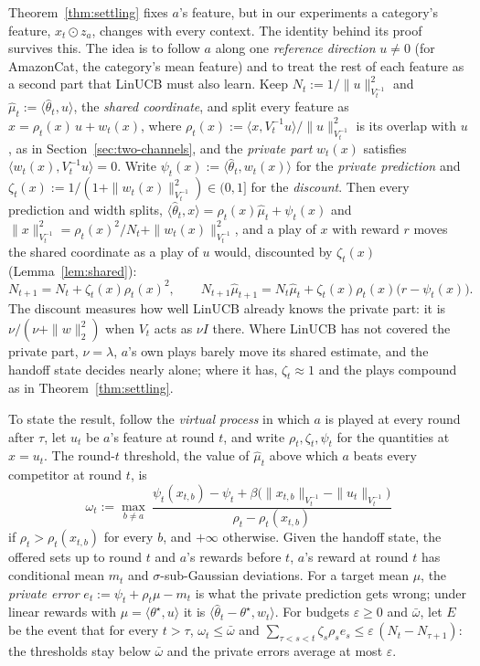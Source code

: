 \documentclass[anon]{alt2027} %
\newif\ifrevmarks\revmarkstrue
\newenvironment{revised}{\ifrevmarks\color{revcolor}\fi}{}
\begin{document}
\begin{revised}
Theorem~\ref{thm:settling} fixes $a$'s feature, but in our experiments a
category's feature, $x_t\odot z_a$, changes with every context. The identity
behind its proof survives this. The idea is to follow $a$ along one
\emph{reference direction} $u\ne0$ (for AmazonCat, the category's mean
feature) and to treat the rest of each feature as a second part that LinUCB
must also learn. Keep $N_t:=1/\|u\|^2_{V_t^{-1}}$ and
$\widehat\mu_t:=\langle\widehat\theta_t,u\rangle$, the \emph{shared
coordinate}, and split every feature as $x=\rho_t(x)\,u+w_t(x)$, where
$\rho_t(x):=\langle x,V_t^{-1}u\rangle/\|u\|^2_{V_t^{-1}}$ is its overlap
with $u$, as in Section~\ref{sec:two-channels}, and the \emph{private part} $w_t(x)$ satisfies
$\langle w_t(x),V_t^{-1}u\rangle=0$. Write
$\psi_t(x):=\langle\widehat\theta_t,w_t(x)\rangle$ for the \emph{private
prediction} and $\zeta_t(x):=1/(1+\|w_t(x)\|^2_{V_t^{-1}})\in(0,1]$ for the
\emph{discount}. Then every prediction and width splits,
$\langle\widehat\theta_t,x\rangle=\rho_t(x)\widehat\mu_t+\psi_t(x)$ and
$\|x\|^2_{V_t^{-1}}=\rho_t(x)^2/N_t+\|w_t(x)\|^2_{V_t^{-1}}$, and a play of
$x$ with reward $r$ moves the shared coordinate as a play of $u$ would,
discounted by $\zeta_t(x)$ (Lemma~\ref{lem:shared}):
\begin{equation}\label{eq:shared}
N_{t+1}=N_t+\zeta_t(x)\rho_t(x)^2,\qquad
N_{t+1}\widehat\mu_{t+1}=N_t\widehat\mu_t+\zeta_t(x)\rho_t(x)\bigl(r-\psi_t(x)\bigr).
\end{equation}
The discount measures how well LinUCB already knows the private part: it is
$\nu/(\nu+\|w\|_2^2)$ when $V_t$ acts as $\nu I$ there. Where LinUCB has not
covered the private part, $\nu=\lambda$, $a$'s own plays barely move its
shared estimate, and the handoff state decides nearly alone; where it has,
$\zeta_t\approx1$ and the plays compound as in Theorem~\ref{thm:settling}.

To state the result, follow the \emph{virtual process} in which $a$ is
played at every round after $\tau$, let $u_t$ be $a$'s feature at round $t$,
and write $\rho_t,\zeta_t,\psi_t$ for the quantities at $x=u_t$. The
round-$t$ threshold, the value of $\widehat\mu_t$ above which $a$ beats every
competitor at round $t$, is
\[
\omega_t:=\max_{b\ne a}\
\frac{\psi_t(x_{t,b})-\psi_t+\beta\bigl(\|x_{t,b}\|_{V_t^{-1}}-\|u_t\|_{V_t^{-1}}\bigr)}
{\rho_t-\rho_t(x_{t,b})}
\]
if $\rho_t>\rho_t(x_{t,b})$ for every $b$, and $+\infty$ otherwise. Given
the handoff state, the offered sets up to round $t$ and $a$'s rewards before
$t$, $a$'s reward at round $t$ has conditional mean $m_t$ and
$\sigma$-sub-Gaussian deviations. For a target mean $\mu$, the \emph{private
error} $e_t:=\psi_t+\rho_t\mu-m_t$ is what the private prediction gets wrong;
under linear rewards with $\mu=\langle\theta^\star,u\rangle$ it is
$\langle\widehat\theta_t-\theta^\star,w_t\rangle$. For budgets
$\varepsilon\ge0$ and $\bar\omega$, let $E$ be the event that for every
$t>\tau$, $\omega_t\le\bar\omega$ and
$\sum_{\tau<s<t}\zeta_s\rho_se_s\le\varepsilon\,(N_t-N_{\tau+1})$: the
thresholds stay below $\bar\omega$ and the private errors average at most
$\varepsilon$.


\end{revised}
\end{document}
